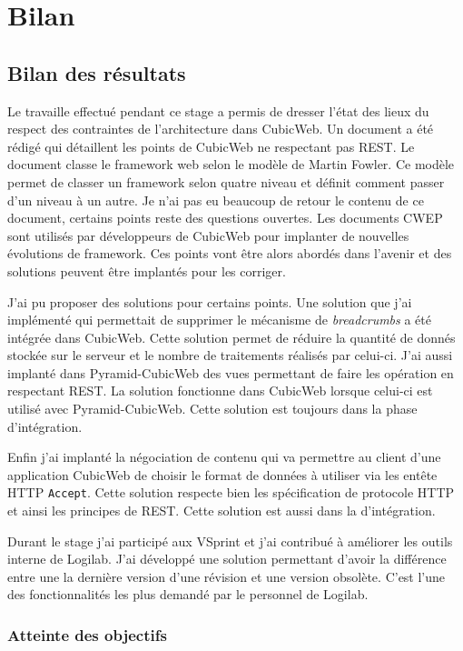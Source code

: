\chapter{Bilan}
\lipsum[8]
\section{Bilan des résultats}
Le travaille effectué pendant ce stage a permis de dresser l'état des lieux du respect des contraintes de l'architecture  dans CubicWeb. Un document  a été rédigé qui détaillent les points de CubicWeb ne respectant pas REST. Le document classe le framework web selon le modèle de Martin Fowler\cite{rmm}. Ce modèle permet de classer un framework selon quatre niveau et définit comment passer d'un niveau à un autre. Je n'ai pas eu beaucoup de retour le contenu de ce document, certains points reste des questions ouvertes. Les documents CWEP sont utilisés par développeurs de CubicWeb pour implanter de nouvelles évolutions de framework. Ces points vont être alors abordés dans l'avenir et des solutions peuvent être implantés pour les corriger. 

J'ai pu proposer des solutions pour certains points. Une solution que j'ai implémenté qui permettait de supprimer le mécanisme de \textit{breadcrumbs} a été intégrée dans CubicWeb. Cette solution permet de réduire la quantité de donnés stockée sur le serveur et le nombre de traitements réalisés par celui-ci. J'ai aussi implanté dans Pyramid-CubicWeb des vues permettant de faire les opération  en respectant REST. La solution fonctionne dans CubicWeb lorsque celui-ci est utilisé avec Pyramid-CubicWeb. Cette solution est toujours dans la phase d'intégration.

Enfin j'ai implanté la négociation de contenu qui va permettre au client d'une application CubicWeb de choisir le format de données à utiliser via les entête HTTP \texttt{Accept}. Cette solution respecte bien les spécification de protocole HTTP et ainsi les principes de REST. Cette solution est aussi dans la d'intégration.

Durant le stage j'ai participé aux VSprint et j'ai contribué à améliorer les outils interne de Logilab. J'ai développé une solution permettant d'avoir la différence entre une la dernière version d'une révision et une version obsolète. C'est l'une des fonctionnalités les plus demandé par le personnel de Logilab.     
\subsection{Atteinte des objectifs}
\lipsum[14]
\lipsum[5]
